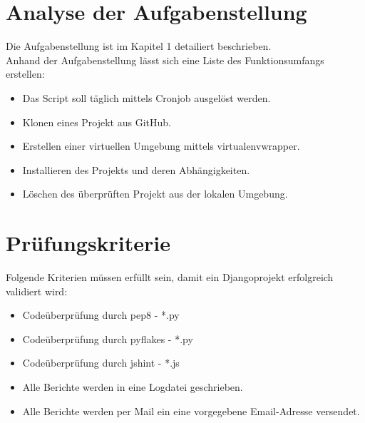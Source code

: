 \section{Analyse der Aufgabenstellung}
Die Aufgabenstellung ist im Kapitel 1 detailiert beschrieben. \\
Anhand der Aufgabenstellung lässt sich eine Liste des Funktionsumfangs erstellen:
\begin{itemize}
    \item Das Script soll täglich mittels Cronjob ausgelöst werden.
    \item Klonen eines Projekt aus GitHub. 
    \item Erstellen einer virtuellen Umgebung mittels virtualenvwrapper.
    \item Installieren des Projekts und deren Abhängigkeiten.
    \item Löschen des überprüften Projekt aus der lokalen Umgebung.
\end{itemize}


\section{Prüfungskriterie}
Folgende Kriterien müssen erfüllt sein, damit ein Djangoprojekt erfolgreich validiert wird:
\begin{itemize}
    \item Codeüberprüfung durch pep8 - *.py
    \item Codeüberprüfung durch pyflakes - *.py
    \item Codeüberprüfung durch jshint - *.js
    \item Alle Berichte werden in eine Logdatei geschrieben. 
    \item Alle Berichte werden per Mail ein eine vorgegebene Email-Adresse versendet. 
\end{itemize}
